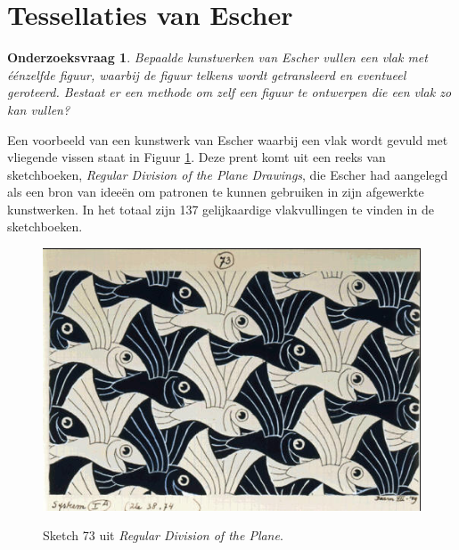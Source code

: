 \documentclass[11pt]{article}
\newtheorem{onderzoeksvraag}{Onderzoeksvraag}
\begin{document}
\section{Tessellaties van Escher}

\begin{onderzoeksvraag}
Bepaalde kunstwerken van {\it Escher} vullen een vlak met éénzelfde figuur, waarbij de figuur telkens wordt getransleerd en eventueel geroteerd. Bestaat er een methode om zelf een figuur te ontwerpen die een vlak zo kan vullen?
\end{onderzoeksvraag}

Een voorbeeld van een kunstwerk van Escher waarbij een vlak wordt gevuld met vliegende vissen staat in Figuur \ref{fig:E73}. Deze prent komt uit een reeks van sketchboeken, {\it Regular Division of the Plane Drawings}, die Escher had aangelegd als een bron van ideeën om patronen te kunnen gebruiken in zijn afgewerkte kunstwerken. In het totaal zijn 137 gelijkaardige vlakvullingen te vinden in de sketchboeken.

\begin{figure}[ht]
  \centering
  \includegraphics{E73}
  \label{fig:E73}
  \caption{Sketch 73 uit {\it Regular Division of the Plane}.}
\end{figure}
\end{document}
